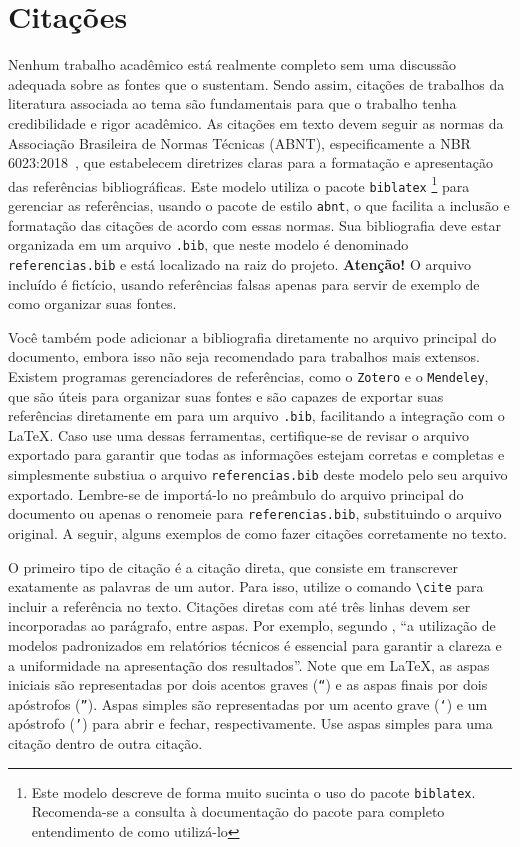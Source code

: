 \section{Citações}

Nenhum trabalho acadêmico está realmente completo sem uma discussão adequada sobre as fontes que o
sustentam. Sendo assim, citações de trabalhos da literatura associada ao tema são fundamentais para
que o trabalho tenha credibilidade e rigor acadêmico. As citações em texto devem seguir as normas da
Associação Brasileira de Normas Técnicas (ABNT), especificamente a NBR
6023:2018~\cite{nbr6023:2018}, que estabelecem diretrizes claras para a formatação
e apresentação das referências bibliográficas. Este modelo utiliza o pacote \texttt{biblatex}%
%
\footnote{Este modelo descreve de forma muito sucinta o uso do pacote \texttt{biblatex}.
    Recomenda-se a consulta à documentação do pacote para completo entendimento de como utilizá-lo}%
%
para gerenciar as referências, usando o pacote de estilo \texttt{abnt}, o que facilita a inclusão e
formatação das citações de acordo com essas normas. Sua bibliografia deve estar organizada em um
arquivo \texttt{.bib}, que neste modelo é denominado \texttt{referencias.bib} e está localizado na
raiz do projeto. \textbf{Atenção!}  O arquivo incluído é fictício, usando referências falsas apenas
para servir de exemplo de como organizar suas fontes.

Você também pode adicionar a bibliografia diretamente no arquivo principal do
documento, embora isso não seja recomendado para trabalhos mais extensos. Existem programas
gerenciadores de referências, como o \texttt{Zotero} e o \texttt{Mendeley}, que são úteis para
organizar suas fontes e são capazes de exportar suas referências diretamente em para um arquivo
\texttt{.bib}, facilitando a integração com o \LaTeX. Caso use uma dessas ferramentas, certifique-se
de revisar o arquivo exportado para garantir que todas as informações estejam corretas e completas e
simplesmente substiua o arquivo \texttt{referencias.bib} deste modelo pelo seu arquivo exportado.
Lembre-se de importá-lo no preâmbulo do arquivo principal do documento ou apenas o renomeie para
\texttt{referencias.bib}, substituindo o arquivo original. A seguir, alguns exemplos de como fazer citações corretamente no texto.

O primeiro tipo de citação é a citação direta, que consiste em transcrever exatamente as palavras de
um autor. Para isso, utilize o comando \texttt{\textbackslash cite} para incluir a referência no
texto. Citações diretas com até três linhas devem ser incorporadas ao parágrafo, entre aspas. Por
exemplo, segundo \textcite{fernandes2019}, ``a utilização de modelos padronizados em relatórios
técnicos é essencial para garantir a clareza e a uniformidade na apresentação dos resultados''. Note
que em \LaTeX, as aspas iniciais são representadas por dois acentos graves (\texttt{``}) e as aspas
finais por dois apóstrofos (\texttt{''}). Aspas simples são representadas por um acento grave
(\texttt{`}) e um apóstrofo (\texttt{'}) para abrir e fechar, respectivamente. Use aspas simples
para uma citação dentro de outra citação.

